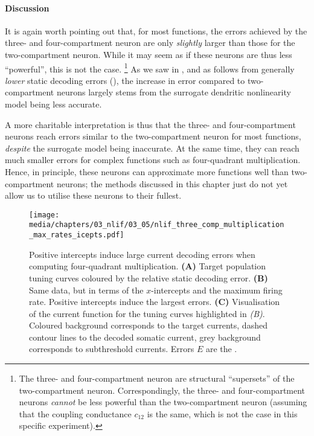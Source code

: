 \paragraph{Discussion}
It is again worth pointing out that, for most functions, the errors achieved by the three- and four-compartment neuron are only \emph{slightly} larger than those for the two-compartment neuron.
While it may seem as if these neurons are thus less \enquote{powerful}, this is not the case.%
\footnote{
The three- and four-compartment neuron are structural \enquote{supersets} of the two-compartment neuron.
Correspondingly, the three- and four-compartment neurons \emph{cannot} be less powerful than the two-compartment neuron (assuming that the coupling conductance $c_{12}$ is the same, which is not the case in this specific experiment).
}
As we saw in , and as follows from generally \emph{lower} static decoding errors (), the increase in error compared to two-compartment neurons largely stems from the surrogate dendritic nonlinearity model being less accurate.

A more charitable interpretation is thus that the three- and four-compartment neurons reach errors similar to the two-compartment neuron for most functions, \emph{despite} the surrogate model being inaccurate.
At the same time, they can reach much smaller errors for complex functions such as four-quadrant multiplication.
Hence, in principle, these neurons can approximate more functions well than two-compartment neurons; the methods discussed in this chapter just do not yet allow us to utilise these neurons to their fullest.

\begin{figure}
	\centering
	\texttt{[image: media/chapters/03\_nlif/03\_05/nlif\_three\_comp\_multiplication\_max\_rates\_icepts.pdf]}
	\caption[Positive intercepts induce large current decoding errors]{Positive intercepts induce large current decoding errors when computing four-quadrant multiplication.
	\textbf{(A)} Target population tuning curves coloured by the relative static decoding error.
	\textbf{(B)} Same data, but in terms of the $x$-intercepts and the maximum firing rate. Positive intercepts induce the largest errors. 
	\textbf{(C)} Visualisation of the current function for the tuning curves highlighted in \emph{(B)}. Coloured background corresponds to the target currents, dashed contour lines to the decoded somatic current, grey background corresponds to subthreshold currents.
	Errors $E$ are the \NRMSE.
	}
	\label{fig:nlif_three_comp_multiplication_max_rates_icepts}
\end{figure}


